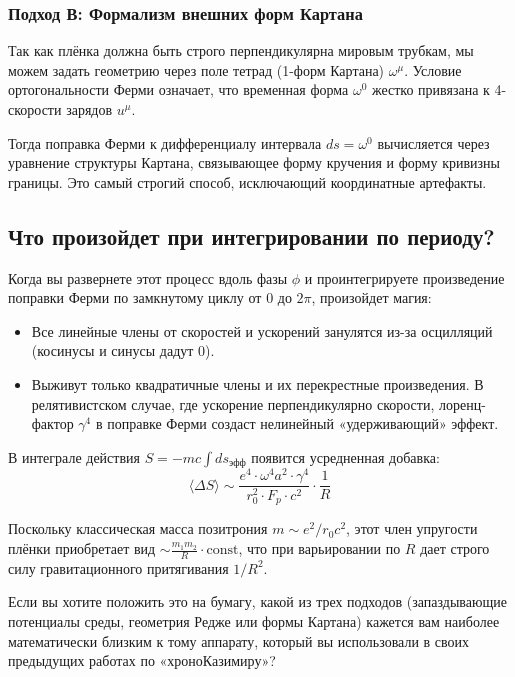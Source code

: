 \documentclass[12pt,a4paper]{article}
\begin{document}
\subsubsection*{Подход В: Формализм внешних форм Картана}

Так как плёнка должна быть строго перпендикулярна мировым трубкам, мы можем задать геометрию через поле тетрад (1-форм Картана) $\omega^\mu$. Условие ортогональности Ферми означает, что временная форма $\omega^0$ жестко привязана к 4-скорости зарядов $u^\mu$.

Тогда поправка Ферми к дифференциалу интервала $ds = \omega^0$ вычисляется через уравнение структуры Картана, связывающее форму кручения и форму кривизны границы. Это самый строгий способ, исключающий координатные артефакты.

\subsection*{Что произойдет при интегрировании по периоду?}

Когда вы развернете этот процесс вдоль фазы $\phi$ и проинтегрируете произведение поправки Ферми по замкнутому циклу от $0$ до $2\pi$, произойдет магия:

\begin{itemize}
    \item Все линейные члены от скоростей и ускорений занулятся из-за осцилляций (косинусы и синусы дадут 0).
    \item Выживут только квадратичные члены и их перекрестные произведения. В релятивистском случае, где ускорение перпендикулярно скорости, лоренц-фактор $\gamma^4$ в поправке Ферми создаст нелинейный «удерживающий» эффект.
\end{itemize}

В интеграле действия $S = -mc \int ds_{эфф}$ появится усредненная добавка:
\begin{equation}
\langle \Delta S \rangle \sim \frac{e^4 \cdot \omega^4 a^2 \cdot \gamma^4}{r_0^2 \cdot F_p \cdot c^2} \cdot \frac{1}{R}
\end{equation}

Поскольку классическая масса позитрония $m \sim e^2 / r_0 c^2$, этот член упругости плёнки приобретает вид $\sim \frac{m_1 m_2}{R} \cdot \text{const}$, что при варьировании по $R$ дает строго силу гравитационного притягивания $1/R^2$.

Если вы хотите положить это на бумагу, какой из трех подходов (запаздывающие потенциалы среды, геометрия Редже или формы Картана) кажется вам наиболее математически близким к тому аппарату, который вы использовали в своих предыдущих работах по «хроноКазимиру»?
\end{document}
